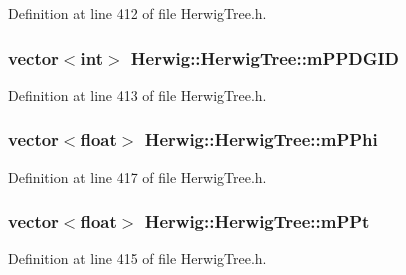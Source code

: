 Definition at line 412 of file Herwig\+Tree.\+h.

\subsubsection[{\texorpdfstring{m\+P\+P\+D\+G\+ID}{mPPDGID}}]{\setlength{\rightskip}{0pt plus 5cm}vector$<$int$>$ Herwig\+::\+Herwig\+Tree\+::m\+P\+P\+D\+G\+ID\hspace{0.3cm}{\ttfamily [protected]}}\hypertarget{class_herwig_1_1_herwig_tree_ac0b628d7f65f0dd5282a6f37ed75cd62}{}\label{class_herwig_1_1_herwig_tree_ac0b628d7f65f0dd5282a6f37ed75cd62}


Definition at line 413 of file Herwig\+Tree.\+h.

\subsubsection[{\texorpdfstring{m\+P\+Phi}{mPPhi}}]{\setlength{\rightskip}{0pt plus 5cm}vector$<$float$>$ Herwig\+::\+Herwig\+Tree\+::m\+P\+Phi\hspace{0.3cm}{\ttfamily [protected]}}\hypertarget{class_herwig_1_1_herwig_tree_afd0e29eb67ff06d6325fc5773bcb7d96}{}\label{class_herwig_1_1_herwig_tree_afd0e29eb67ff06d6325fc5773bcb7d96}


Definition at line 417 of file Herwig\+Tree.\+h.

\subsubsection[{\texorpdfstring{m\+P\+Pt}{mPPt}}]{\setlength{\rightskip}{0pt plus 5cm}vector$<$float$>$ Herwig\+::\+Herwig\+Tree\+::m\+P\+Pt\hspace{0.3cm}{\ttfamily [protected]}}\hypertarget{class_herwig_1_1_herwig_tree_a7097209613587b2065e46044fe3e0dcf}{}\label{class_herwig_1_1_herwig_tree_a7097209613587b2065e46044fe3e0dcf}


Definition at line 415 of file Herwig\+Tree.\+h.

